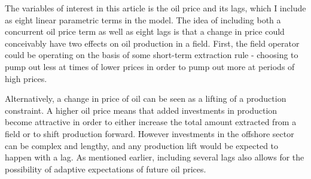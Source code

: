\documentclass[12pt]{article}
\begin{document}
The variables of interest in this article is the oil price and its lags, which I include as eight linear parametric terms in the model.  The idea of including both a concurrent oil price term as well as eight lags is that a change in price could conceivably have two effects on oil production in a field.  First, the field operator could be operating on the basis of some short-term extraction rule - choosing to pump out less at times of lower prices in order to pump out more at periods of high prices.  

Alternatively, a change in price of oil can be seen as a lifting of a production constraint.  A higher oil price means that added investments in production become attractive in order to either increase the total amount extracted from a field or to shift production forward.  However investments in the offshore sector can be complex and lengthy, and any production lift would be expected to happen with a lag.  As mentioned earlier, including several lags also allows for the possibility of adaptive expectations of future oil prices.  
\end{document}
